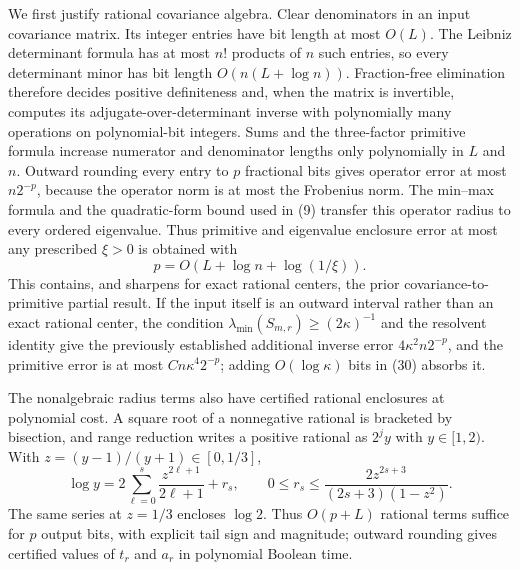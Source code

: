 We first justify rational covariance algebra.  Clear denominators in an input covariance matrix.  Its integer entries have bit length at most \(O(L)\).  The Leibniz determinant formula has at most \(n!\) products of \(n\) such entries, so every determinant minor has bit length \(O(n(L+\log n))\).  Fraction-free elimination therefore decides positive definiteness and, when the matrix is invertible, computes its adjugate-over-determinant inverse with polynomially many operations on polynomial-bit integers.  Sums and the three-factor primitive formula increase numerator and denominator lengths only polynomially in \(L\) and \(n\).  Outward rounding every entry to \(p\) fractional bits gives operator error at most \(n2^{-p}\), because the operator norm is at most the Frobenius norm.  The min--max formula and the quadratic-form bound used in (9) transfer this operator radius to every ordered eigenvalue.  Thus primitive and eigenvalue enclosure error at most any prescribed \(\xi>0\) is obtained with
\[
 p=O\!\left(L+\log n+\log(1/\xi)\right).
 \tag{30}
\]
This contains, and sharpens for exact rational centers, the prior covariance-to-primitive partial result.  If the input itself is an outward interval rather than an exact rational center, the condition \(\lambda_{\min}(S_{m,r})\ge(2\kappa)^{-1}\) and the resolvent identity give the previously established additional inverse error \(4\kappa^2n2^{-p}\), and the primitive error is at most \(Cn\kappa^4 2^{-p}\); adding \(O(\log\kappa)\) bits in (30) absorbs it.

The nonalgebraic radius terms also have certified rational enclosures at polynomial cost.  A square root of a nonnegative rational is bracketed by bisection, and range reduction writes a positive rational as \(2^jy\) with \(y\in[1,2)\).  With \(z=(y-1)/(y+1)\in[0,1/3]\),
\[
 \log y=2\sum_{\ell=0}^{s}\frac{z^{2\ell+1}}{2\ell+1}+r_s,
 \qquad
 0\le r_s\le\frac{2z^{2s+3}}{(2s+3)(1-z^2)}.
\]
The same series at \(z=1/3\) encloses \(\log2\).  Thus \(O(p+L)\) rational terms suffice for \(p\) output bits, with explicit tail sign and magnitude; outward rounding gives certified values of \(t_r\) and \(a_r\) in polynomial Boolean time.

